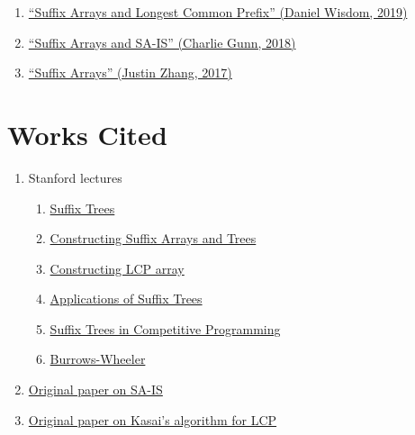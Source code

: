 \documentclass[11pt, oneside]{article}
\begin{document}
\begin{enumerate}
  \item \href{https://activities.tjhsst.edu/sct/lectures/1819/2019_03_29_Suffix_Arrays_and_LCP.pdf}{``Suffix Arrays and Longest Common Prefix'' (Daniel Wisdom, 2019)}
  \item \href{https://activities.tjhsst.edu/sct/lectures/1819/2018_12_07_Suffix_Arrays.pdf}{``Suffix Arrays and SA-IS'' (Charlie Gunn, 2018)}
  \item \href{https://activities.tjhsst.edu/sct/lectures/1617/2017-05-24_Suffix_Arrays.pdf}{``Suffix Arrays'' (Justin Zhang, 2017)}
\end{enumerate}

\section{Works Cited}

\begin{enumerate}
  \item Stanford lectures
    \begin{enumerate}
      \item \href{http://web.stanford.edu/class/cs166/lectures/02/Slides02.pdf}{Suffix Trees}
      \item \href{http://web.stanford.edu/class/cs166/lectures/04/Small04.pdf}{Constructing Suffix Arrays and Trees}
      \item \href{http://web.stanford.edu/class/cs166/lectures/03/Slides03.pdf}{Constructing LCP array}
      \item \href{http://web.stanford.edu/class/archive/cs/cs166/cs166.1186/lectures/03/Small03.pdf}{Applications of Suffix Trees}
      \item \href{http://web.stanford.edu/class/cs97si/suffix-array.pdf}{Suffix Trees in Competitive Programming}
      \item \href{https://web.stanford.edu/class/cs262/presentations/lecture4.pdf}{Burrows-Wheeler}
    \end{enumerate}
  \item \href{https://github.com/vladtepes1473/FM-Index/blob/master/readings/Linear%20Suffix%20Array%20Construction%20by%20Almost%20Pure%20Induced-Sorting.pdf}
  {Original paper on SA-IS}
  \item \href{http://web.cs.iastate.edu/~cs548/references/linear_lcp.pdf}{Original paper on Kasai's algorithm for LCP}
\end{enumerate}
\end{document}
